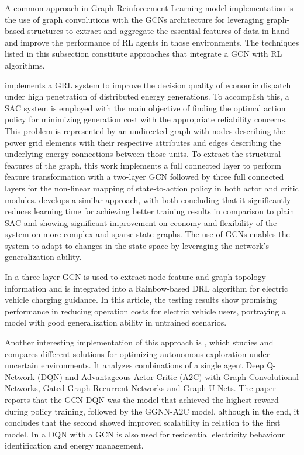 A common approach in Graph Reinforcement Learning model implementation is the use of graph convolutions with the \acp{GCN} architecture for leveraging graph-based structures to extract and aggregate the essential features of data in hand and improve the performance of \ac{RL} agents in those environments. The techniques listed in this subsection constitute approaches that integrate a \ac{GCN} with \ac{RL} algorithms.\par
\cite{liNovelGraphReinforcement2022} implements a \ac{GRL} system to improve the decision quality of economic dispatch under high penetration of distributed energy generations. To accomplish this, a \ac{SAC} system is employed with the main objective of finding the optimal action policy for minimizing generation cost with the appropriate reliability concerns. This problem is represented by an undirected graph with nodes describing the power grid elements with their respective attributes and edges describing the underlying energy connections between those units. To extract the structural features of the graph, this work implements a full connected layer to perform feature transformation with a two-layer \ac{GCN} followed by three full connected layers for the non-linear mapping of state-to-action policy in both actor and critic modules. \cite{chenScalableGraphReinforcement2023} develops a similar approach, with both concluding that it significantly reduces learning time for achieving better training results in comparison to plain \ac{SAC} and showing significant improvement on economy and flexibility of the system on more complex and sparse state graphs. The use of \acp{GCN} enables the system to adapt to changes in the state space by leveraging the network's generalization ability.\par
In \cite{xingGraphReinforcementLearningBased2023} a three-layer \ac{GCN} is used to extract node feature and graph topology information and is integrated into a Rainbow-based \cite{hesselRainbowCombiningImprovements2018} \ac{DRL} algorithm for electric vehicle charging guidance. In this article, the testing results show promising performance in reducing operation costs for electric vehicle users, portraying a model with good generalization ability in untrained scenarios. \par
Another interesting implementation of this approach is \cite{chenAutonomousExplorationUncertainty2020}, which studies and compares different solutions for optimizing autonomous exploration under uncertain environments. It analyzes combinations of a single agent Deep Q-Network (DQN) and Advantageous Actor-Critic (A2C) with Graph Convolutional Networks, Gated Graph Recurrent Networks and Graph U-Nets. The paper reports that the GCN-DQN was the model that achieved the highest reward during policy training, followed by the GGNN-A2C model, although in the end, it concludes that the second showed improved scalability in relation to the first model. In \cite{chenGraphRepresentationLearningbased2023} a DQN with a GCN is also used for residential electricity behaviour identification and energy management.


